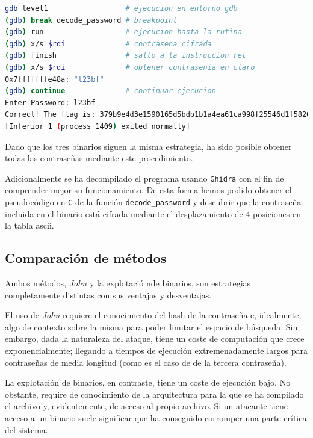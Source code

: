 \documentclass[]{article}
\begin{document}
\lstset{style=bash}
\begin{center}
    \begin{lstlisting}[language=bash,caption=Obtención de contraseña para level1 en gdb]
gdb level1                  # ejecucion en entorno gdb
(gdb) break decode_password # breakpoint
(gdb) run                   # ejecucion hasta la rutina
(gdb) x/s $rdi              # contrasena cifrada
(gdb) finish                # salto a la instruccion ret
(gdb) x/s $rdi              # obtener contrasenia en claro
0x7fffffffe48a:	"l23bf"
(gdb) continue              # continuar ejecucion
Enter Password: l23bf
Correct! The flag is: 379b9e4d3e1590165d5bdb1b1a4ea61ca998f25546d1f5820394e98971098d84
[Inferior 1 (process 1409) exited normally]
\end{lstlisting}
\end{center}

Dado que los tres binarios siguen la misma estrategia, ha sido posible obtener todas las contraseñas mediante este procedimiento.

Adicionalmente se ha decompilado el programa usando \texttt{Ghidra} con el fin de comprender mejor su funcionamiento. De esta forma hemos podido obtener el pseudocódigo en \texttt{C} de la función \texttt{decode\_password} y descubrir que la contraseña incluida en el binario está cifrada mediante el desplazamiento de 4 posiciones en la tabla ascii.

\subsection{Comparación de métodos}
\label{subsec:comparacion}
Ambos métodos, \textit{John} y la explotació nde binarios, son estrategias completamente distintas con sus ventajas y desventajas.

El uso de \textit{John} requiere el conocimiento del hash de la contraseña e, idealmente, algo de contexto sobre la misma para poder limitar el espacio de búsqueda. Sin embargo, dada la naturaleza del ataque, tiene un coste de computación que crece exponencialmente; llegando a tiempos de ejecución extremenadamente largos para contraseñas de media longitud (como es el caso de de la tercera contraseña).

La explotación de binarios, en contraste, tiene un coste de ejecución bajo. No obstante, require de conocimiento de la arquitectura para la que se ha compilado el archivo y, evidentemente, de acceso al propio archivo. Si un atacante tiene acceso a un binario suele significar que ha conseguido corromper una parte crítica del sistema.
\end{document}
